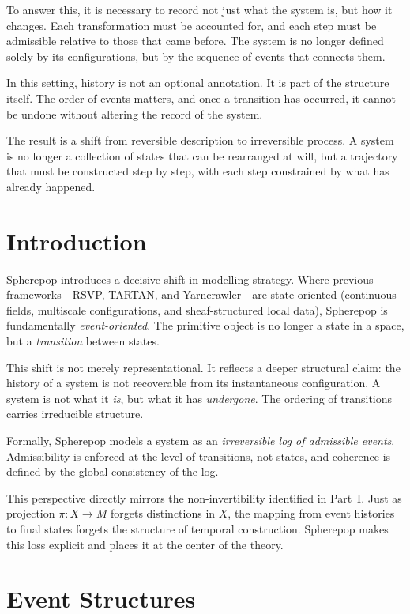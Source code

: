 \documentclass[11pt,openany]{book}
\begin{document}
To answer this, it is necessary to record not just what the system is, but how it changes. Each transformation must be accounted for, and each step must be admissible relative to those that came before. The system is no longer defined solely by its configurations, but by the sequence of events that connects them.

In this setting, history is not an optional annotation. It is part of the structure itself. The order of events matters, and once a transition has occurred, it cannot be undone without altering the record of the system.

The result is a shift from reversible description to irreversible process. A system is no longer a collection of states that can be rearranged at will, but a trajectory that must be constructed step by step, with each step constrained by what has already happened.

\section{Introduction}
\label{sec:introduction-spherepop}

Spherepop introduces a decisive shift in modelling strategy.
Where previous frameworks—RSVP, TARTAN, and Yarncrawler—are
state-oriented (continuous fields, multiscale configurations,
and sheaf-structured local data), Spherepop is fundamentally
\emph{event-oriented}. The primitive object is no longer a
state in a space, but a \emph{transition} between states.

This shift is not merely representational. It reflects a
deeper structural claim: the history of a system is not
recoverable from its instantaneous configuration. A system
is not what it \emph{is}, but what it has \emph{undergone}.
The ordering of transitions carries irreducible structure.

Formally, Spherepop models a system as an \emph{irreversible
log of admissible events}. Admissibility is enforced at the
level of transitions, not states, and coherence is defined
by the global consistency of the log.

This perspective directly mirrors the non-invertibility
identified in Part~I. Just as projection $\pi : X \to M$
forgets distinctions in $X$, the mapping from event histories
to final states forgets the structure of temporal
construction. Spherepop makes this loss explicit and places
it at the center of the theory.

\section{Event Structures}
\label{sec:event-structures}
\end{document}
